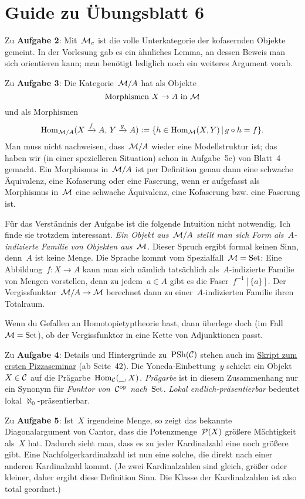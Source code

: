 \documentclass{uebblatt}
\begin{document}
\section*{Guide zu Übungsblatt 6}

Zu \textbf{Aufgabe 2}: Mit~$\M_c$ ist die volle Unterkategorie der kofasernden
Objekte gemeint. In der Vorlesung gab es ein ähnliches Lemma, an dessen Beweis
man sich orientieren kann; man benötigt lediglich noch ein weiteres Argument
vorab.

Zu \textbf{Aufgabe 3}: Die Kategorie~$\M/A$ hat als Objekte
\[ \text{Morphismen~$X \to A$ in~$\M$} \]
und als Morphismen
\[ \Hom_{\M/A}(X \xra{f} A,\, Y \xra{g} A) \defeq \{ h \in \Hom_\M(X,Y) \,|\,
  g \circ h = f \}. \]
Man muss nicht nachweisen, dass~$\M/A$ wieder eine Modellstruktur ist; das
haben wir (in einer spezielleren Situation) schon in Aufgabe~5c) von Blatt~4
gemacht. Ein Morphismus in~$\M/A$ ist per Definition genau dann eine schwache
Äquivalenz, eine Kofaserung oder eine Faserung, wenn er aufgefasst als
Morphismus in~$\M$ eine schwache Äquivalenz, eine Kofaserung bzw. eine Faserung
ist.

Für das Verständnis der Aufgabe ist die folgende Intuition nicht notwendig. Ich
finde sie trotzdem interessant. \emph{Ein Objekt aus~$\M/A$ stellt man sich Form
als~$A$-indizierte Familie von Objekten aus~$\M$.} Dieser Spruch ergibt formal
keinen Sinn, denn~$A$ ist keine Menge. Die Sprache kommt vom Spezialfall~$\M =
\Set$: Eine Abbildung~$f : X \to A$ kann man sich nämlich tatsächlich
als~$A$-indizierte Familie von Mengen vorstellen, denn zu jedem~$a \in A$ gibt
es die Faser~$f^{-1}[\{a\}]$. Der Vergissfunktor~$\M/A \to \M$ berechnet dann
zu einer~$A$-indizierten Familie ihren Totalraum.

Wenn du Gefallen an Homotopietyptheorie hast, dann überlege doch (im Fall~$\M =
\Set$), ob der Vergissfunktor in eine Kette von Adjunktionen passt.

Zu \textbf{Aufgabe 4}: Details und Hintergründe zu~$\PSh(\C)$ stehen auch im
\href{http://pizzaseminar.speicherleck.de/skript1/pizzaseminar.pdf}{Skript zum ersten
Pizzaseminar} (ab Seite~42). Die Yoneda-Einbettung~$y$ schickt ein Objekt~$X
\in \C$ auf die Prägarbe~$\Hom_\C(\smallplaceholder, X)$. \emph{Prägarbe} ist
in diesem Zusammenhang nur ein Synonym für \emph{Funktor von~$\C^\op$
nach~$\Set$}. \emph{Lokal endlich-präsentierbar} bedeutet lokal
$\aleph_0$-präsentierbar.

Zu \textbf{Aufgabe 5}: Ist~$X$ irgendeine Menge, so zeigt das bekannte
Diagonalargument von Cantor, dass die Potenzmenge~$\P(X)$ größere Mächtigkeit
als~$X$ hat. Dadurch sieht man, dass es zu jeder Kardinalzahl eine noch größere
gibt. Eine Nachfolgerkardinalzahl ist nun eine solche, die direkt nach einer
anderen Kardinalzahl kommt. (Je zwei Kardinalzahlen sind gleich, größer oder
kleiner, daher ergibt diese Definition Sinn. Die Klasse der Kardinalzahlen ist
also total geordnet.)
\end{document}
